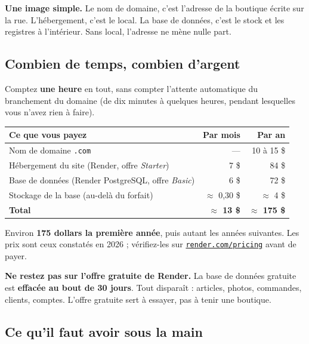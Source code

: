 \documentclass[11pt,a4paper]{article}
\newcommand{\champ}[1]{\textit{#1}}
\newcommand{\saisir}[1]{\texttt{#1}}
\newcommand{\lien}[2]{\href{#1}{\texttt{#2}}}
\begin{document}
\begin{conseil}
\textbf{Une image simple.} Le nom de domaine, c'est l'adresse de la boutique
écrite sur la rue. L'hébergement, c'est le local. La base de données, c'est le
stock et les registres à l'intérieur. Sans local, l'adresse ne mène nulle part.
\end{conseil}

\subsection{Combien de temps, combien d'argent}

Comptez \textbf{une heure} en tout, sans compter l'attente automatique du
branchement du domaine (de dix minutes à quelques heures, pendant lesquelles
vous n'avez rien à faire).

\begin{center}
\begin{tabularx}{\textwidth}{@{}Xrr@{}}
\toprule
\textbf{Ce que vous payez} & \textbf{Par mois} & \textbf{Par an} \\
\midrule
Nom de domaine \saisir{.com} & --- & 10 à 15 \$ \\
Hébergement du site (Render, offre \champ{Starter}) & 7 \$ & 84 \$ \\
Base de données (Render PostgreSQL, offre \champ{Basic}) & 6 \$ & 72 \$ \\
Stockage de la base (au-delà du forfait) & $\approx$ 0,30 \$ & $\approx$ 4 \$ \\
\midrule
\textbf{Total} & \textbf{$\approx$ 13 \$} & \textbf{$\approx$ 175 \$} \\
\bottomrule
\end{tabularx}
\end{center}

Environ \textbf{175 dollars la première année}, puis autant les années
suivantes. Les prix sont ceux constatés en 2026 ; vérifiez-les sur
\lien{https://render.com/pricing}{render.com/pricing} avant de payer.

\begin{attention}
\textbf{Ne restez pas sur l'offre gratuite de Render.} La base de données
gratuite est \textbf{effacée au bout de 30 jours}. Tout disparaît : articles,
photos, commandes, clients, comptes. L'offre gratuite sert à essayer, pas à
tenir une boutique.
\end{attention}

\subsection{Ce qu'il faut avoir sous la main}
\end{document}
